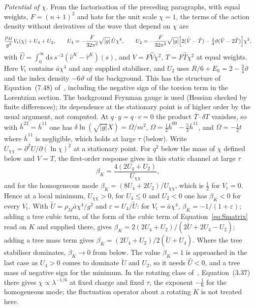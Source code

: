 \emph{Potential of \(\chi\).} From the factorisation of the preceding paragraphs, with equal weights, \(F=(n+1)^2\) and hats for the unit scale \(\chi=1\), the terms of the action density without derivatives of the wave that depend on \(\chi\) are
\[
\frac{\rho_M}{g^2}V_{\mathrm t}(\chi)+U_4+U_2,\qquad
U_4=-\frac{F}{32\pi^2}\sqrt{|g|}\,\hat U\chi^4,\qquad
U_2=-\frac{F}{32\pi^2}\sqrt{|g|}\Bigl[2(\hat V-\hat T)-\tfrac34\vartheta(\hat V-2\hat T)\Bigr]\chi^2,
\]
with \(\hat U=\int_0^\infty\mathrm ds\,s^{-3}(\hat v^K-\hat\tau^K)(s)\), and \(V=F\hat V\chi^2\), \(T=F\hat T\chi^2\) at equal weights. Here \(V_{\mathrm t}\) contains \(\bar a\chi^4\) and any supplied stabiliser, and \(U_2\) uses \(R/6+E_0=2-\tfrac34\vartheta\) and the index density \(-6\vartheta\) of the background. This has the structure of Equation~(7.48) of~\cite{Steinacker2023}, including the negative sign of the torsion term in the Lorentzian section. The background Feynman gauge is used (Hessian checked by finite differences); its dependence at the stationary point is of higher order by the usual argument, not computed. At \(q\cdot y=q\cdot v=0\) the product \(\bar T\cdot\delta T\) vanishes, so with \(\bar h^{22}=\bar h^{11}\) one has \(\delta\ln(\sqrt{|g|}X)=\Omega/m^2\), \(\Omega=\tfrac12\bar h^{00}-\tfrac53\bar h^{11}\), and \(\Omega=-\tfrac12t\) where \(\bar h^{11}\) is negligible, which holds at large \(\tau\) (below). Write \(U_{\chi\chi}=\partial^2U/\partial(\ln\chi)^2\) at a stationary point. For \(q^2\) below the mass of \(\chi\) defined below and \(V=T\), the first-order response gives in this static channel at large \(\tau\)
\[
\beta_K=\frac{4(2U_4+U_2)}{U_{\chi\chi}},
\]
and for the homogeneous mode \(\beta_K=(8U_4+2U_2)/U_{\chi\chi}\), which is \(\tfrac12\) for \(V_{\mathrm t}=0\). Hence at a local minimum, \(U_{\chi\chi}>0\), for \(U_4\le0\) and \(U_2<0\) one has \(\beta_K<0\) for every \(V_{\mathrm t}\). With \(\tilde U=\rho_M\bar a\chi^4/g^2\) and \(\varepsilon=U_4/\tilde U\): for \(V_{\mathrm t}=\bar a\chi^4\), \(\beta_K=-1/(1+\varepsilon)\); adding a tree cubic term, of the form of the cubic term of Equation~\eqref{eq:Smatrix} read on \(K\) and supplied there, gives \(\beta_K=2(2U_4+U_2)/(2\tilde U+2U_4-U_2)\); adding a tree mass term gives \(\beta_K=(2U_4+U_2)/2(\tilde U+U_4)\). Where the tree stabiliser dominates, \(\beta_K\to0\) from below. The value \(\beta_K=1\) is approached in the last case as \(U_4>0\) comes to dominate \(\tilde U\) and \(U_2\), so it needs \(\hat U<0\), and a tree mass of negative sign for the minimum. In the rotating class of~\cite{MantaSteinacker2025b}, Equation~(3.37) there gives \(\chi\propto\lambda^{-1/6}\) at fixed charge and fixed \(\tau\), the exponent \(-\tfrac16\) for the homogeneous mode; the fluctuation operator about a rotating \(K\) is not treated here.

